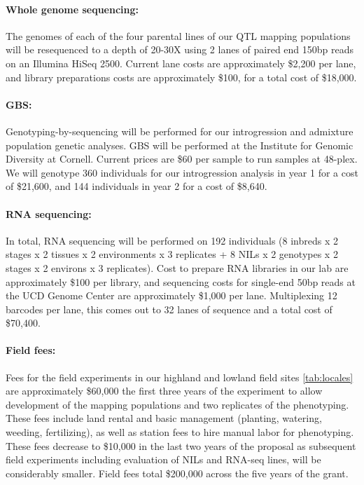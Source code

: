 \paragraph{Whole genome sequencing:}
The genomes of each of the four parental lines of our QTL mapping populations will be resequenced to a depth of 20-30X using 2 lanes of paired end 150bp reads on an Illumina HiSeq 2500. Current lane costs are approximately \$2,200 per lane, and library preparations costs are approximately \$100, for a total cost of \$18,000.

\paragraph{GBS:}
Genotyping-by-sequencing will be performed for our introgression and admixture population genetic analyses. GBS will be performed at the Institute for Genomic Diversity at Cornell.  Current prices are \$60 per sample to run samples at 48-plex.  We will genotype 360 individuals for our introgression analysis in year 1 for a cost of \$21,600, and 144 individuals in year 2 for a cost of \$8,640. 

\paragraph{RNA sequencing:}
In total, RNA sequencing will be performed on 192 individuals (8 inbreds x 2 stages x 2 tissues x 2 environments x 3 replicates + 8 NILs x 2 genotypes x 2 stages x 2 environs x 3 replicates).  Cost to prepare RNA libraries in our lab are approximately \$100 per library, and sequencing costs for single-end 50bp reads at the UCD Genome Center are approximately \$1,000 per lane.  Multiplexing 12 barcodes per lane, this comes out to 32 lanes of sequence and a total cost of \$70,400.

\paragraph{Field fees:}
Fees for the field experiments in our highland and lowland field sites \ref{tab:locales} are approximately \$60,000 the first three years of the experiment to allow development of the mapping populations and two replicates of the phenotyping.  These fees include land rental and basic management (planting, watering, weeding, fertilizing), as well as station fees to hire manual labor for phenotyping.  These fees decrease to \$10,000 in the last two years of the proposal as subsequent field experiments including evaluation of NILs and RNA-seq lines, will be considerably smaller. Field fees total \$200,000 across the five years of the grant.

